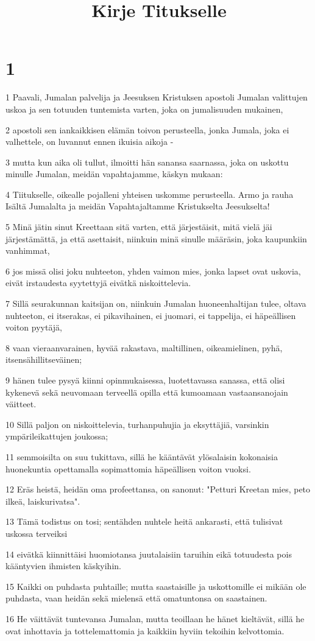 

\title{Kirje Titukselle}


\chapter{1}

\par 1 Paavali, Jumalan palvelija ja Jeesuksen Kristuksen apostoli Jumalan valittujen uskoa ja sen totuuden tuntemista varten, joka on jumalisuuden mukainen,
\par 2 apostoli sen iankaikkisen elämän toivon perusteella, jonka Jumala, joka ei valhettele, on luvannut ennen ikuisia aikoja -
\par 3 mutta kun aika oli tullut, ilmoitti hän sanansa saarnassa, joka on uskottu minulle Jumalan, meidän vapahtajamme, käskyn mukaan:
\par 4 Tiitukselle, oikealle pojalleni yhteisen uskomme perusteella. Armo ja rauha Isältä Jumalalta ja meidän Vapahtajaltamme Kristukselta Jeesukselta!
\par 5 Minä jätin sinut Kreettaan sitä varten, että järjestäisit, mitä vielä jäi järjestämättä, ja että asettaisit, niinkuin minä sinulle määräsin, joka kaupunkiin vanhimmat,
\par 6 jos missä olisi joku nuhteeton, yhden vaimon mies, jonka lapset ovat uskovia, eivät irstaudesta syytettyjä eivätkä niskoittelevia.
\par 7 Sillä seurakunnan kaitsijan on, niinkuin Jumalan huoneenhaltijan tulee, oltava nuhteeton, ei itserakas, ei pikavihainen, ei juomari, ei tappelija, ei häpeällisen voiton pyytäjä,
\par 8 vaan vieraanvarainen, hyvää rakastava, maltillinen, oikeamielinen, pyhä, itsensähillitseväinen;
\par 9 hänen tulee pysyä kiinni opinmukaisessa, luotettavassa sanassa, että olisi kykenevä sekä neuvomaan terveellä opilla että kumoamaan vastaansanojain väitteet.
\par 10 Sillä paljon on niskoittelevia, turhanpuhujia ja eksyttäjiä, varsinkin ympärileikattujen joukossa;
\par 11 semmoisilta on suu tukittava, sillä he kääntävät ylösalaisin kokonaisia huonekuntia opettamalla sopimattomia häpeällisen voiton vuoksi.
\par 12 Eräs heistä, heidän oma profeettansa, on sanonut: "Petturi Kreetan mies, peto ilkeä, laiskurivatsa".
\par 13 Tämä todistus on tosi; sentähden nuhtele heitä ankarasti, että tulisivat uskossa terveiksi
\par 14 eivätkä kiinnittäisi huomiotansa juutalaisiin taruihin eikä totuudesta pois kääntyvien ihmisten käskyihin.
\par 15 Kaikki on puhdasta puhtaille; mutta saastaisille ja uskottomille ei mikään ole puhdasta, vaan heidän sekä mielensä että omatuntonsa on saastainen.
\par 16 He väittävät tuntevansa Jumalan, mutta teoillaan he hänet kieltävät, sillä he ovat inhottavia ja tottelemattomia ja kaikkiin hyviin tekoihin kelvottomia.


